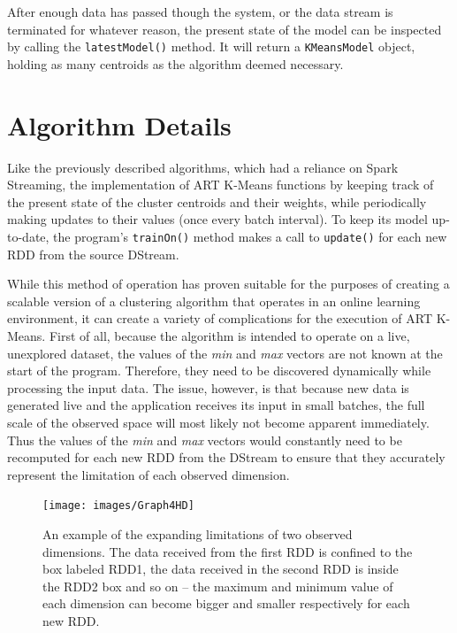 \documentclass{l4proj}
\begin{document}
After enough data has passed though the system, or the data stream is terminated for whatever reason, the present state of the model can be inspected by calling the \texttt{latestModel()} method. It will return a \texttt{KMeansModel} object, holding as many centroids as the algorithm deemed necessary.

\section{Algorithm Details}

Like the previously described algorithms, which had a reliance on Spark Streaming, the implementation of ART K-Means functions by keeping track of the present state of the cluster centroids and their weights, while periodically making updates to their values (once every batch interval). To keep its model up-to-date, the program's \texttt{trainOn()} method makes a call to \texttt{update()} for each new RDD from the source DStream. 

While this method of operation has proven suitable for the purposes of creating a scalable version of a clustering algorithm that operates in an online learning environment, it can create a variety of complications for the execution of ART K-Means. First of all, because the algorithm is intended to operate on a live, unexplored dataset, the values of the \textit{min} and \textit{max} vectors are not known at the start of the program. Therefore, they need to be discovered dynamically while processing the input data. The issue, however, is that because new data is generated live and the application receives its input in small batches, the full scale of the observed space will most likely not become apparent immediately. Thus the values of the \textit{min} and \textit{max} vectors would constantly need to be recomputed for each new RDD from the DStream to ensure that they accurately represent the limitation of each observed dimension.\\

\begin{figure}[H]
	\centering
    \label{minMaxgraph}
    \texttt{[image: images/Graph4HD]}
    \caption{An example of the expanding limitations of two observed dimensions. The data received from the first RDD is confined to the box labeled RDD1, the data received in the second RDD is inside the RDD2 box and so on -- the maximum and minimum value of each dimension can become bigger and smaller respectively for each new RDD.} 
\end{figure}
\end{document}
